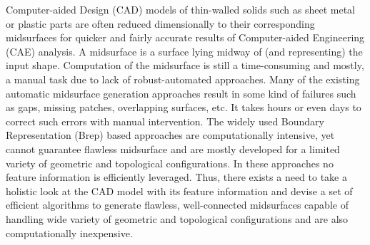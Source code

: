 

Computer-aided Design (CAD) models of thin-walled solids such as sheet metal or plastic parts are often reduced dimensionally to their corresponding midsurfaces for quicker and fairly accurate results of Computer-aided Engineering (CAE) analysis.  A midsurface is a surface lying midway of (and representing) the input shape.  Computation of the midsurface is still a time-consuming and mostly, a manual task due to lack of robust-automated approaches. Many of the existing automatic midsurface generation approaches result in some kind of failures such as gaps, missing patches, overlapping surfaces, etc. It takes hours or even days to correct such errors with manual intervention. The widely used Boundary Representation (Brep) based approaches are computationally intensive, yet cannot guarantee flawless midsurface and are mostly developed for a limited variety of geometric and topological configurations.  In these approaches no feature information is efficiently leveraged. Thus, there exists a need to take a holistic look at the CAD model with its feature information and devise a set of efficient algorithms to generate flawless, well-connected midsurfaces capable of handling wide variety of geometric and topological configurations and are also computationally inexpensive. %

